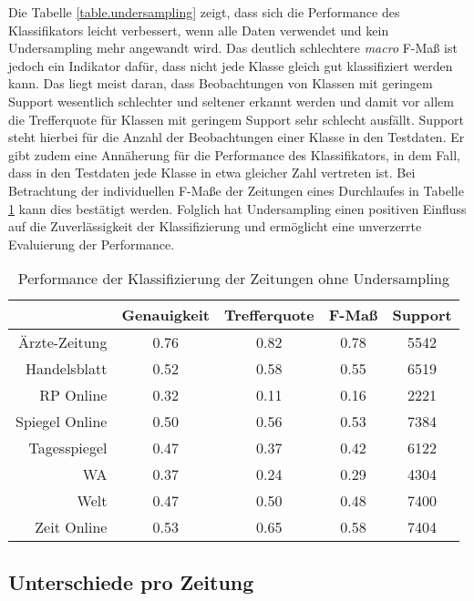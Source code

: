 Die Tabelle \ref{table.undersampling} zeigt, dass sich die Performance des Klassifikators leicht verbessert, wenn alle Daten verwendet und kein Undersampling mehr angewandt wird. Das deutlich schlechtere \textit{macro} F-Maß ist jedoch ein Indikator dafür, dass nicht jede Klasse gleich gut klassifiziert werden kann. Das liegt meist daran, dass Beobachtungen von Klassen mit geringem Support wesentlich schlechter und seltener erkannt werden und damit vor allem die Trefferquote für Klassen mit geringem Support sehr schlecht ausfällt. Support steht hierbei für die Anzahl der Beobachtungen einer Klasse in den Testdaten. Er gibt zudem eine Annäherung für die Performance des Klassifikators, in dem Fall, dass in den Testdaten jede Klasse in etwa gleicher Zahl vertreten ist. Bei Betrachtung der individuellen F-Maße der Zeitungen eines Durchlaufes in Tabelle \ref{table.no_undersampling_individual} kann dies bestätigt werden. Folglich hat Undersampling einen positiven Einfluss auf die Zuverlässigkeit der Klassifizierung und ermöglicht eine unverzerrte Evaluierung der Performance.

\begin{table}
\centering
\begin{spacing}{1.25}
\begin{tabular}[t]{rcccc}
\toprule
~ & Genauigkeit & Trefferquote & F-Maß & Support\\
\midrule
Ärzte-Zeitung & 0.76 & 0.82 & 0.78 & 5542\\
Handelsblatt & 0.52 & 0.58 & 0.55 & 6519\\
RP Online & 0.32 & 0.11 & 0.16 & 2221\\
Spiegel Online & 0.50 & 0.56 & 0.53 & 7384\\
Tagesspiegel & 0.47 & 0.37 & 0.42 & 6122\\
WA & 0.37 & 0.24 & 0.29 & 4304\\
Welt & 0.47 & 0.50 & 0.48 & 7400\\
Zeit Online & 0.53 & 0.65 & 0.58 & 7404\\
\bottomrule
\end{tabular}
\caption{Performance der Klassifizierung der Zeitungen ohne Undersampling}
\label{table.no_undersampling_individual}
\end{spacing}
\end{table}

\subsection{Unterschiede pro Zeitung}

